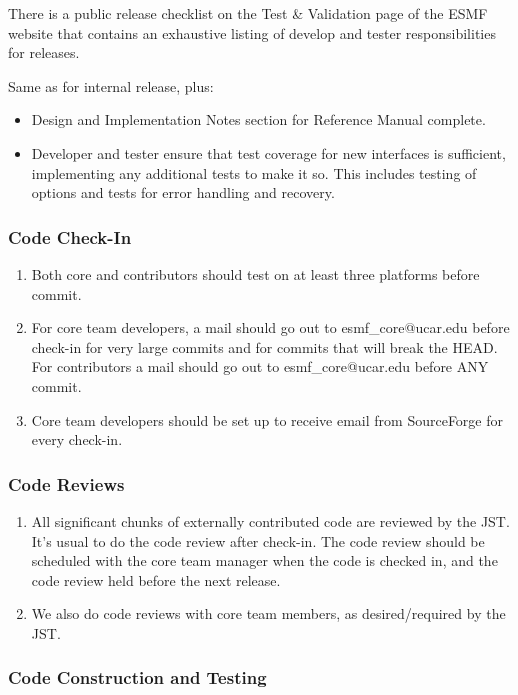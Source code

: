 There is a public release checklist on the Test \& Validation page of the ESMF
website that contains an exhaustive listing of develop and tester responsibilities for releases.

Same as for internal release, plus:
\begin{itemize}
\item Design and Implementation Notes section for Reference Manual complete.
\item Developer and tester ensure that test coverage for new interfaces is sufficient, implementing any additional tests to make it so. This includes testing of options and tests for error handling and recovery.
\end{itemize}

\subsubsection{Code Check-In}
\begin{enumerate}
\item Both core and contributors should test on at least three platforms before commit.
\item For core team developers, a mail should go out to esmf\_core@ucar.edu
before check-in for very large commits and for commits that will break the
HEAD. For contributors a mail should go out to esmf\_core@ucar.edu before
ANY commit.
\item Core team developers should be set up to receive email from SourceForge
for every check-in.
\end{enumerate}

\subsubsection{Code Reviews}
\begin{enumerate}
\item All significant chunks of externally contributed code are reviewed by the JST. It's usual to do the code review after check-in. The code review should
be scheduled with the core team manager when the code is checked in, and
the code review held before the next release.
\item We also do code reviews with core team members, as desired/required
by the JST. 
\end{enumerate}

\subsubsection {Code Construction and Testing}


